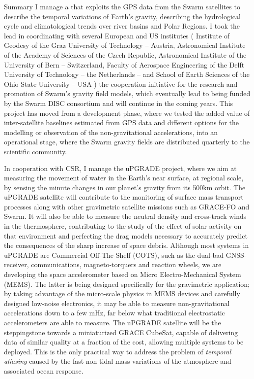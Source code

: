 \begin{cvtext}{Summary}
I manage a  that exploits the \ac{GPS} data from the Swarm satellites to describe the temporal variations of Earth's gravity, describing the hydrological cycle and climatological trends over river basins and Polar Regions.
I took the lead in coordinating with several European and US institutes (%
Institute of Geodesy of the Graz University of Technology -- Austria,
Astronomical Institute of the Academy of Sciences of the Czech Republic,
Astronomical Institute of the University of Bern -- Switzerland,
Faculty of Aerospace Engineering of the Delft University of Technology -- the Netherlands -- and
School of Earth Sciences of the Ohio State University -- USA%
) the cooperation initiative for the research and promotion of Swarm's gravity field models, which eventually lead to being funded by the Swarm \ac{DISC} consortium and will continue in the coming years.
This project has moved from a development phase, where we tested the added value of inter-satellite baselines estimated from GPS data and different options for the modelling or observation of the non-gravitational accelerations, into an operational stage, where the Swarm gravity fields are distributed quarterly to the scientific community.

In cooperation with \ac{CSR}, I manage the uPGRADE project, where we aim at measuring the movement of water in the Earth’s near surface, at regional scale, by sensing the minute changes in our planet’s gravity from its 500km orbit.
The uPGRADE satellite will contribute to the monitoring of surface mass transport processes along with other gravimetric satellite missions such as GRACE-FO and Swarm.
It will also be able to measure the neutral density and cross-track winds in the thermosphere, contributing to the study of the effect of solar activity on that environment and perfecting the drag models necessary to accurately predict the consequences of the sharp increase of space debris.
Although most systems in uPGRADE are Commercial Off-The-Shelf (COTS), such as the dual-bad GNSS-receiver, communications, magneto-torquers and reaction wheels, we are developing the space accelerometer based on Micro Electro-Mechanical System (MEMS).
The latter is being designed specifically for the gravimetric application; by taking advantage of the micro-scale physics in MEMS devices and carefully designed low-noise electronics, it may be able to measure non-gravitational accelerations down to a few mHz, far below what traditional electrostatic accelerometers are able to measure.
The uPGRADE satellite will be the steppingstone towards a miniaturized GRACE CubeSat, capable of delivering data of similar quality at a fraction of the cost, allowing multiple systems to be deployed.
This is the only practical way to address the problem of \emph{temporal aliasing} caused by the fast non-tidal mass variations of the atmosphere and associated ocean response.


\end{cvtext}
